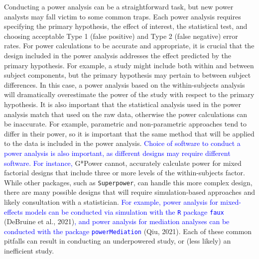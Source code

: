 \documentclass[
  man, donotrepeattitle,mask,floatsintext]{apa7}
\begin{document}
Conducting a power analysis can be a straightforward task, but new power analysts may fall victim to some common traps. Each power analysis requires specifying the primary hypothesis, the effect of interest, the statistical test, and choosing acceptable Type 1 (false positive) and Type 2 (false negative) error rates. For power calculations to be accurate and appropriate, it is crucial that the design included in the power analysis addresses the effect predicted by the primary hypothesis. For example, a study might include both within and between subject components, but the primary hypothesis may pertain to between subject differences. In this case, a power analysis based on the within-subjects analysis will dramatically overestimate the power of the study with respect to the primary hypothesis. It is also important that the statistical analysis used in the power analysis match that used on the raw data, otherwise the power calculations can be inaccurate. For example, parametric and non-parametric approaches tend to differ in their power, so it is important that the same method that will be applied to the data is included in the power analysis. \textcolor{blue}{Choice of software to conduct a power analysis is also important, as different designs may require different software. For instance,} G*Power cannot, accurately calculate power for mixed factorial designs that include three or more levels of the within-subjects factor. While other packages, such as \texttt{Superpower}, can handle this more complex design, there are many possible designs that will require simulation-based approaches and likely consultation with a statistician. \textcolor{blue}{For example, power analysis for mixed-effects models can be conducted via simulation with the \texttt{R} package \texttt{faux}} (DeBruine et al., 2021)\textcolor{blue}{, and power analysis for mediation analyses can be conducted with the package \texttt{powerMediation}} (Qiu, 2021). Each of these common pitfalls can result in conducting an underpowered study, or (less likely) an inefficient study.
\end{document}
